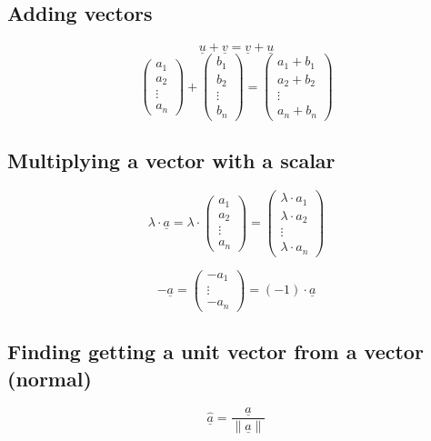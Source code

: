 \documentclass[00_complete]{subfiles}
\begin{document}
\subsection{Adding vectors}

$$\underline u + \underline v = \underline v + \underline u$$
$$\begin{pmatrix}
    a_1 \\a_2\\\vdots\\a_n
\end{pmatrix}+\begin{pmatrix}
    b_1 \\b_2\\\vdots\\b_n
\end{pmatrix}=\begin{pmatrix}
    a_1+b_1\\a_2+b_2\\\vdots\\a_n+b_n
\end{pmatrix}$$

\subsection{Multiplying a vector with a scalar}

$$\lambda \cdot \underline a  = \lambda \cdot \begin{pmatrix}
    a_1\\a_2\\\vdots\\a_n
\end{pmatrix} = \begin{pmatrix}
    \lambda \cdot a_1 \\
    \lambda \cdot a_2 \\
    \vdots \\
    \lambda \cdot a_n
\end{pmatrix}$$

$$- \underline a = \begin{pmatrix}
    -a_1\\\vdots\\-a_n
\end{pmatrix} = (-1) \cdot \underline a$$

\subsection{Finding getting a unit vector from a vector (normal)}

$$\underline{\hat a} = \frac{\underline a}{\|\underline a\|}$$
\end{document}
